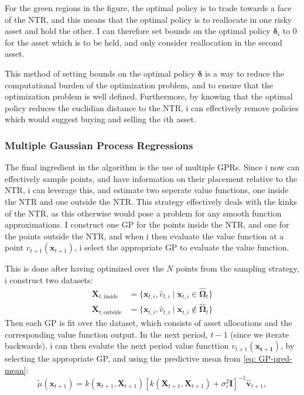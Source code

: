 \documentclass[11pt]{article}
\begin{document}
For the green regions in the figure, the optimal policy is to trade towards a face of the \ac{NTR}, and this means that the optimal policy is to reallocate in one risky asset and hold the other.
I can therefore set bounds on the optimal policy $\boldsymbol{\delta}_{i}$ to $0$ for the asset which is to be held, and only consider reallocation in the second asset.

This method of setting bounds on the optimal policy $\boldsymbol{\delta}$ is a way to reduce the computational burden of the optimization problem, and to ensure that the optimization problem is well defined.
Furthermore, by knowing that the optimal policy reduces the euclidian distance to the \ac{NTR}, i can effectively remove policies which would suggest buying and selling the $i$th asset. 
\subsubsection{Multiple Gaussian Process Regressions} \label{Subsubsection: NTR-GPR}
The final ingredient in the algorithm is the use of multiple \ac{GPR}s.
Since i now can effectively sample points, and have information on their placement relative to the \ac{NTR},
i can leverage this, and estimate two seperate value functions, one inside the \ac{NTR} and one outside the \ac{NTR}.
This strategy effectively deals with the kinks of the \ac{NTR}, as this otherwise would pose a problem for any smooth function approximations.
I construct one \ac{GP} for the points inside the \ac{NTR}, and one for the points outside the \ac{NTR}, and when i then evaluate the value function at a point $v_{t+1}(\mathbf{x}_{t+1})$,
i select the appropriate \ac{GP} to evaluate the value function.

This is done after having optimized over the $N$ points from the sampling strategy, i construct two datasets:
\begin{align}
  \mathbf{X}_{t,\text{inside}} &= \{ \mathbf{x}_{t,i} , \hat{v}_{t,i} \mid \mathbf{x}_{t,i} \in \hat{\boldsymbol{\Omega}}_{t} \}\\
  \mathbf{X}_{t,\text{outside}} &= \{ \mathbf{x}_{t,i} , \hat{v}_{t,i} \mid \mathbf{x}_{t,i} \notin \hat{\boldsymbol{\Omega}}_{t} \}
\end{align}
Then each \ac{GP} is fit over the dataset, which consists of asset allocations and the corresponding value function output.
In the next period, $t-1$ (since we iterate backwards), i can then evalute the next period value functtion $v_{t+1}(\mathbf{x_{t+1}})$,
by selecting the appropriate \ac{GP}, and using the predictive mean from \eqref{eq: GP-pred-mean}:
\begin{equation} \label{eq: valuefunctin_gp_mean}
  \tilde{\mu}(\mathbf{x}_{t+1}) = k(\mathbf{x}_{t+1}, \mathbf{X}_{t+1}) [k(\mathbf{X}_{t+1}, \mathbf{X}_{t+1}) + \sigma^{2}_{\varepsilon} \mathbf{I}]^{-1} \hat{\mathbf{v}}_{t+1},
\end{equation}
\end{document}
